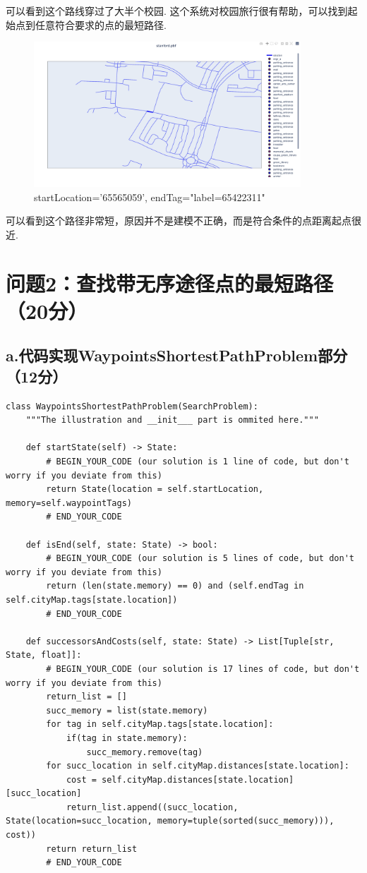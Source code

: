\documentclass{article}
\begin{document}
可以看到这个路线穿过了大半个校园. 这个系统对校园旅行很有帮助，可以找到起始点到任意符合要求的点的最短路径.

\begin{figure}[H]
    \centering
    \includegraphics[width=10cm]{pics/short.png}
    \caption{startLocation='65565059', endTag="label=65422311"}
\end{figure}

可以看到这个路径非常短，原因并不是建模不正确，而是符合条件的点距离起点很近.





\section*{问题2：查找带无序途径点的最短路径（20分）}
\subsection*{a.代码实现WaypointsShortestPathProblem部分（12分）}
 \begin{lstlisting}
class WaypointsShortestPathProblem(SearchProblem):
    """The illustration and __init___ part is ommited here."""

    def startState(self) -> State:
        # BEGIN_YOUR_CODE (our solution is 1 line of code, but don't worry if you deviate from this)
        return State(location = self.startLocation, memory=self.waypointTags)
        # END_YOUR_CODE

    def isEnd(self, state: State) -> bool:
        # BEGIN_YOUR_CODE (our solution is 5 lines of code, but don't worry if you deviate from this)
        return (len(state.memory) == 0) and (self.endTag in self.cityMap.tags[state.location])
        # END_YOUR_CODE

    def successorsAndCosts(self, state: State) -> List[Tuple[str, State, float]]:
        # BEGIN_YOUR_CODE (our solution is 17 lines of code, but don't worry if you deviate from this)
        return_list = []
        succ_memory = list(state.memory)
        for tag in self.cityMap.tags[state.location]:
            if(tag in state.memory):
                succ_memory.remove(tag)
        for succ_location in self.cityMap.distances[state.location]:
            cost = self.cityMap.distances[state.location][succ_location]
            return_list.append((succ_location, State(location=succ_location, memory=tuple(sorted(succ_memory))), cost))
        return return_list
        # END_YOUR_CODE
\end{lstlisting}
\end{document}
